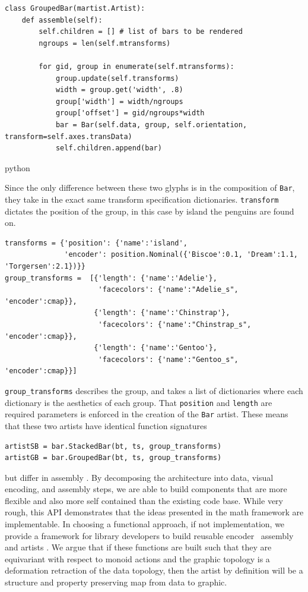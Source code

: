 \documentclass[../main.tex]{subfiles}
\begin{document}
\begin{verbatim}
class GroupedBar(martist.Artist):
    def assemble(self):
        self.children = [] # list of bars to be rendered
        ngroups = len(self.mtransforms)
        
        for gid, group in enumerate(self.mtransforms):
            group.update(self.transforms)
            width = group.get('width', .8)
            group['width'] = width/ngroups
            group['offset'] = gid/ngroups*width 
            bar = Bar(self.data, group, self.orientation, transform=self.axes.transData)     
            self.children.append(bar)
\end{verbatim}{python}

Since the only difference between these two glyphs is in the composition of \texttt{Bar}, they take in the exact same transform specification dictionaries. \texttt{transform} dictates the position of the group, in this case by island the penguins are found on.

\begin{verbatim}
transforms = {'position': {'name':'island',
              'encoder': position.Nominal({'Biscoe':0.1, 'Dream':1.1, 'Torgersen':2.1})}} 
group_transforms =  [{'length': {'name':'Adelie'},
                      'facecolors': {'name':"Adelie_s", 'encoder':cmap}},
                     {'length': {'name':'Chinstrap'},
                      'facecolors': {'name':"Chinstrap_s", 'encoder':cmap}}, 
                     {'length': {'name':'Gentoo'},
                      'facecolors': {'name':"Gentoo_s", 'encoder':cmap}}]
\end{verbatim}
\texttt{group_transforms} describes the group, and takes a list of dictionaries where each dictionary is the aesthetics of each group. That \texttt{position} and \texttt{length} are required parameters is enforced in the creation of the \texttt{Bar} artist. These means that these two artists have identical function signatures

\begin{verbatim}
artistSB = bar.StackedBar(bt, ts, group_transforms)
artistGB = bar.GroupedBar(bt, ts, group_transforms)
\end{verbatim}

but differ in assembly \vmarkd. By decomposing the architecture into data, visual encoding, and assembly steps, we are able to build components that are more flexible and also more self contained than the existing code base. While very rough, this API demonstrates that the ideas presented in the math framework are implementable. In choosing a functional approach, if not implementation, we provide a framework for library developers to build reusable encoder \vchannel\, assembly \vmarkd and artists \vartist. We argue that  if these functions are built such that they are equivariant with respect to monoid actions and the graphic topology is a deformation retraction of the data topology, then the artist by definition will be a structure and property preserving map from data to graphic. 
\end{document}

